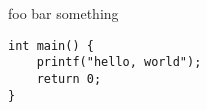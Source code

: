 \documentclass{article}
\begin{document}
foo bar something

\begin{verbatim}
int main() {
    printf("hello, world");
    return 0;
}
\end{verbatim}
\end{document}
